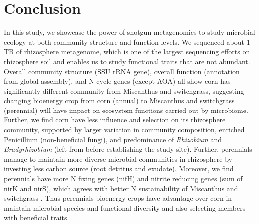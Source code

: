 \documentclass[]{msu-thesis}
\begin{document}
\section{Conclusion}

In this study, we showcase the power of shotgun metagenomics to study microbial ecology at both community structure and function levels. We sequenced about 1 TB of rhizosphere metagenome, which is one of the largest sequencing efforts on rhizosphere soil and enables us to study functional traits that are not abundant. Overall community structure (SSU rRNA gene), overall function (annotation from global assembly), and N cycle genes (except AOA) all show corn has significantly different community from Miscanthus and switchgrass, suggesting changing bioenergy crop from corn (annual) to Miscanthus and switchgrass (perennial) will have impact on ecosystem functions carried out by microbiome. Further, we find corn have less influence and selection on its rhizosphere community, supported by larger variation in community composition, enriched Penicillium (non-beneficial fungi), and predominance of \textit{Rhizobium} and \textit{Bradyrhizobium} (left from before establishing the study site). Further, perennials manage to maintain more diverse microbial communities in rhizosphere by investing less carbon source (root detritus and exudate). Moreover, we find perennials have more N fixing genes (nifH) and nitrite reducing genes (sum of nirK and nirS), which agrees with better N sustainability of Miscanthus and switchgrass \cite{schwarz_effect_1994,parrish_biology_2005}. Thus perennials bioenergy crops have advantage over corn in maintain microbial species and functional diversity and also selecting members with beneficial traits.


%
\backmatter
%
%
\makebibliographypage %
%
\SingleSpacing
%
%



\end{document}
